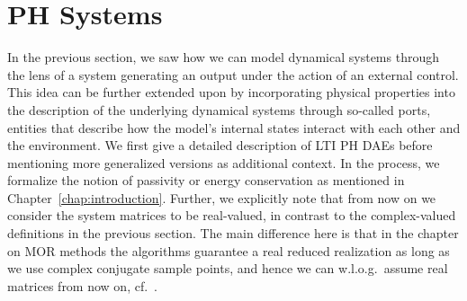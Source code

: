 \section{\acl{PH} Systems}\label{sec:phltis}

In the previous section, we saw how we can model dynamical systems through the lens of a system generating an output under the action of an external control.
This idea can be further extended upon by incorporating physical properties into the description of the underlying dynamical systems through so-called ports, entities that describe how the model's internal states interact with each other and the environment.
We first give a detailed description of \ac{LTI} \ac{PH} \acp{DAE} before mentioning more generalized versions as additional context.
In the process, we formalize the notion of passivity or energy conservation as mentioned in Chapter~\ref{chap:introduction}.
Further, we explicitly note that from now on we consider the system matrices to be real-valued, in contrast to the complex-valued definitions in the previous section.
The main difference here is that in the chapter on \ac{MOR} methods the algorithms guarantee a real reduced realization as long as we use complex conjugate sample points, and hence we can w.l.o.g.\ assume real matrices from now on, cf.~\cite{Gugercin2008}.

